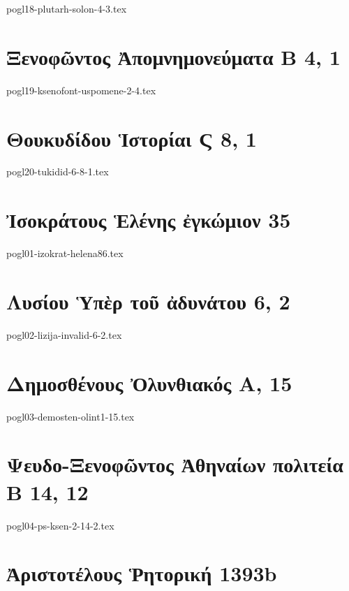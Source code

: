 \documentclass[a4paper,12pt,twoside]{report}
\begin{document}
{pogl18-plutarh-solon-4-3.tex}

\chapter[Ξενοφῶντος Ἀπομνημονεύματα Β]{\textgreek[variant=ancient]{Ξενοφῶντος Ἀπομνημονεύματα Β} 4, 1}

{pogl19-ksenofont-uspomene-2-4.tex}



\chapter[Θουκυδίδου Ἱστορίαι Ϛ]{\textgreek[variant=ancient]{Θουκυδίδου Ἱστορίαι Ϛ} 8, 1}

{pogl20-tukidid-6-8-1.tex}


\chapter[Ἰσοκράτους Ἑλένης ἐγκώμιον]{\textgreek[variant=ancient]{Ἰσοκράτους Ἑλένης ἐγκώμιον} 35}

{pogl01-izokrat-helena86.tex}

\chapter[Λυσίου Ὑπὲρ τοῦ ἀδυνάτου]{\textgreek[variant=ancient]{Λυσίου Ὑπὲρ τοῦ ἀδυνάτου} 6, 2}

{pogl02-lizija-invalid-6-2.tex}

\chapter[Δημοσθένους Ὀλυνθιακός Α]{\textgreek[variant=ancient]{Δημοσθένους Ὀλυνθιακός Α,} 15}

{pogl03-demosten-olint1-15.tex}

\chapter[Ψευδο-Ξενοφῶντος Ἀθηναίων πολιτεία Β]{\textgreek[variant=ancient]{Ψευδο-Ξενοφῶντος Ἀθηναίων πολιτεία \\Β} 14, 12}

{pogl04-ps-ksen-2-14-2.tex}

\chapter[Ἀριστοτέλους Ῥητορική]{\textgreek[variant=ancient]{Ἀριστοτέλους Ῥητορική} 1393b}
\end{document}
